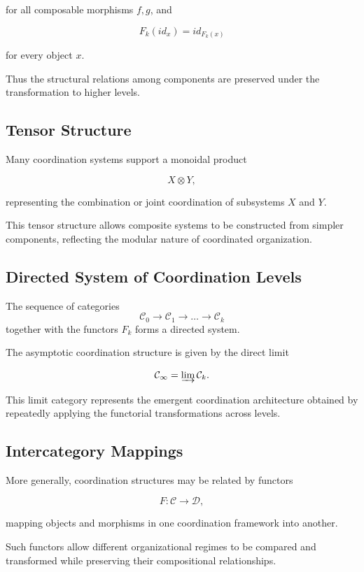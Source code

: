 \documentclass[12pt]{article}
\begin{document}
for all composable morphisms $f,g$, and

\[
F_k(id_x) = id_{F_k(x)}
\]

for every object $x$.

Thus the structural relations among components are preserved under the transformation to higher levels.

\subsection{Tensor Structure}

Many coordination systems support a monoidal product

\[
X \otimes Y ,
\]

representing the combination or joint coordination of subsystems $X$ and $Y$.

This tensor structure allows composite systems to be constructed from simpler components, reflecting the modular nature of coordinated organization.

\subsection{Directed System of Coordination Levels}

The sequence of categories
\[
\mathcal{C}_0 \rightarrow \mathcal{C}_1 \rightarrow \dots \rightarrow \mathcal{C}_k
\]
together with the functors $F_k$ forms a directed system.

The asymptotic coordination structure is given by the direct limit

\[
\mathcal{C}_\infty = \varinjlim \mathcal{C}_k .
\]

This limit category represents the emergent coordination architecture obtained by repeatedly applying the functorial transformations across levels.

\subsection{Intercategory Mappings}

More generally, coordination structures may be related by functors

\[
F : \mathcal{C} \rightarrow \mathcal{D},
\]

mapping objects and morphisms in one coordination framework into another.

Such functors allow different organizational regimes to be compared and transformed while preserving their compositional relationships.
\end{document}
